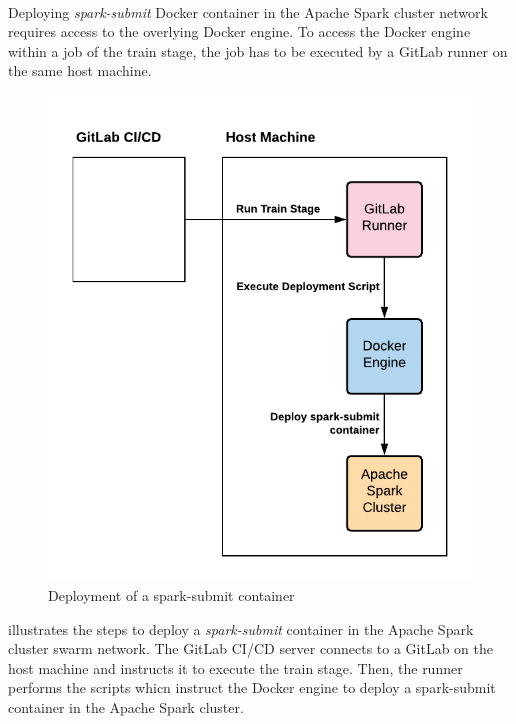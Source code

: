 \paragraph{}
Deploying \textit{spark-submit} Docker container in the Apache Spark cluster network requires access to the overlying Docker engine.
To access the Docker engine within a job of the train stage, the job has to be executed by a GitLab runner on the same host machine.
\begin{figure}[h]
\centering
\includegraphics[scale=1]{images/05_conceptual_design/automated_deployment_pipeline/train_stage_runner}
\caption{Deployment of a spark-submit container}
\label{fig:05_deployment_train_concept}
\end{figure}
 illustrates the steps to deploy a \textit{spark-submit} container in the Apache Spark cluster swarm network.
The GitLab CI/CD server connects to a GitLab on the host machine and instructs it to execute the train stage.
Then, the runner performs the scripts whicn instruct the Docker engine to deploy a spark-submit container in the Apache Spark cluster.
